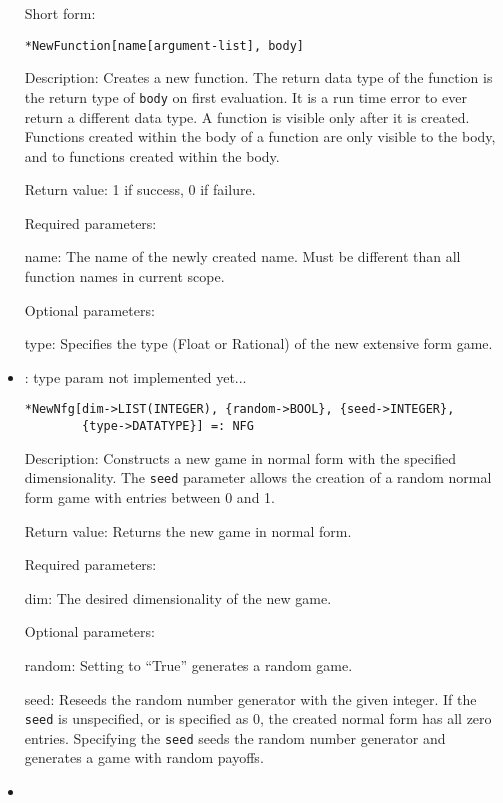 \begin{itemize}
\bd
\item
[Short form:] 
\protect \large \begin{verbatim}
*NewFunction[name[argument-list], body]
\end{verbatim}\normalsize
\item
[Description:] Creates a new function.  The return data type of the
function is the return type of \verb+body+ on first evaluation.  It is
a run time error to ever return a different data type.  A function is
visible only after it is created.  Functions created within the body
of a function are only visible to the body, and to functions created
within the body.
\item
[Return value:] 1 if success, 0 if failure.  
\item
[Required parameters:]
\bd
\item[name:] The name of the newly created name.  Must be different
than all function names in current scope.  
\ed
\item
[Optional parameters:]\hfil\null

\bd
\item
[type:] Specifies the type (Float or Rational) of the new extensive
form game.
\ed
\ed

\item

: type param not implemented yet...
\protect \large \begin{verbatim}
*NewNfg[dim->LIST(INTEGER), {random->BOOL}, {seed->INTEGER},
        {type->DATATYPE}] =: NFG
\end{verbatim}\normalsize

\bd
\item
[Description:] Constructs a new game in normal form with the
specified dimensionality.  The \verb+seed+ parameter allows the creation
of a random normal form game with entries between 0 and 1.

\item
[Return value:] Returns the new game in normal form.
\item
[Required parameters:]\hfil\null
	
\bd
\item
[dim:] The desired dimensionality of the new game.
\ed

\item
[Optional parameters:]\hfil\null
	
\bd
\item
[random:] Setting to ``True'' generates a random game.  
\item
[seed:] Reseeds the random number generator with the given integer.  If the
\verb+seed+ is unspecified, or is specified as 0, the created normal form
has all zero entries.  Specifying the \verb+seed+ seeds the random number
generator and generates a game with random payoffs.
\item


\end{itemize}
